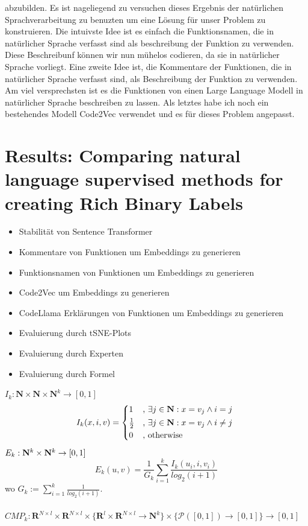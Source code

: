 \documentclass[12pt,letterpaper]{article}
\begin{document}
abzubilden. Es ist nageliegend zu versuchen dieses Ergebnis der natürlichen
Sprachverarbeitung zu benuzten um eine Lösung für unser Problem zu konstruieren.
Die intuivste Idee ist es einfach die Funktionsnamen, die in natürlicher Sprache
verfasst sind als beschreibung der Funktion zu verwenden. Diese Beschreibunf können
wir nun mühelos codieren, da sie in natürlicher Sprache vorliegt.
Eine zweite Idee ist, die Kommentare der Funktionen, die in natürlicher Sprache
verfasst sind, als Beschreibung der Funktion zu verwenden. Am viel versprechsten
ist es die Funktionen von einen Large Language Modell in natürlicher Sprache
beschreiben zu lassen. Als letztes habe ich noch ein bestehendes Modell
Code2Vec verwendet und es für dieses Problem angepasst.






\section{Results: Comparing natural language supervised methods for creating Rich Binary Labels}
\begin{itemize}
  \item Stabilität von Sentence Transformer
  \item Kommentare von Funktionen um Embeddings zu generieren
  \item Funktionsnamen von Funktionen um Embeddings zu generieren
  \item Code2Vec um Embeddings zu generieren
  \item CodeLlama Erklärungen von Funktionen um Embeddings zu generieren
  \item Evaluierung durch tSNE-Plots
  \item Evaluierung durch Experten
  \item Evaluierung durch Formel
\end{itemize}
$ I_{k}: \mathbf{N} \times \mathbf{N} \times \mathbf{N}^{k} \to [0,1]$
\[ I_{k}(x,i,v) = \begin{cases*} 
      1 & , $\exists j \in \mathbf{N}: x = v_j \land i = j$  \\
      \frac{1}{2} & , $\exists j \in \mathbf{N}: x = v_j \land i \neq j$\\
      0   & , \text{otherwise}
                \end{cases*} \]
$E_k: \mathbf{N}^k \times \mathbf{N}^k \to [0,1]$
\[ E_k(u,v) = \frac{1}{G_k} \sum^{k}_{i=1} \frac{I_k(u_i,i,v_i)}{log_2(i+1)}\]
wo $G_k := \sum_{i=1}^{k} \frac{1}{log_2(i+1)}$.\\\\
$CMP_k: \mathbf{R}^{N\times l} \times \mathbf{R}^{N\times l} \times 
\{ \mathbf{R}^l \times \mathbf{R}^{N\times l} \to \mathbf{N}^k \} 
\times \{ \mathcal{P}([0,1]) \to [0,1] \} \to [0,1]$
\end{document}
